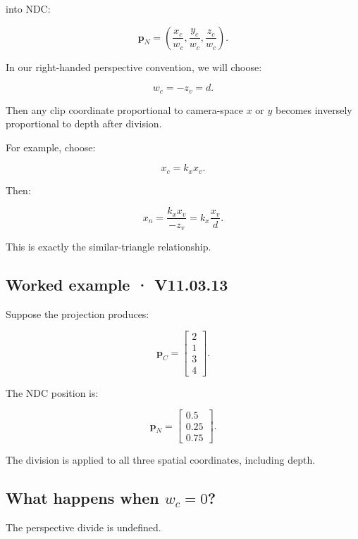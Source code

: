 into NDC:

\[
 \boxed{ \mathbf p_N= \left( \frac{x_c}{w_c}, \frac{y_c}{w_c}, \frac{z_c}{w_c} \right) }.
\]

In our right-handed perspective convention, we will choose:

\[
 \boxed{ w_c=-z_v=d }.
\]

Then any clip coordinate proportional to camera-space \(x\) or \(y\) becomes inversely proportional to depth after division.

For example, choose:

\[
 x_c=k_xx_v.
\]

Then:

\[
 x_n= \frac{k_xx_v}{-z_v} = k_x\frac{x_v}{d}.
\]

This is exactly the similar-triangle relationship.

\begin{allmightroleexample}

\subsection{Worked example · V11.03.13}\label{02-foundations-ii-ch033-worked-example-v11.03.13}

Suppose the projection produces:

\end{allmightroleexample}

\[
 \mathbf p_C= \begin{bmatrix} 2\\1\\3\\4 \end{bmatrix}.
\]

The NDC position is:

\[
 \boxed{ \mathbf p_N= \begin{bmatrix} 0.5\\0.25\\0.75 \end{bmatrix} }.
\]

The division is applied to all three spatial coordinates, including depth.

\subsection{\texorpdfstring{What happens when \(w_c=0\)?}{What happens when w\_c=0?}}\label{02-foundations-ii-ch033-what-happens-when-w_c0}

The perspective divide is undefined.

